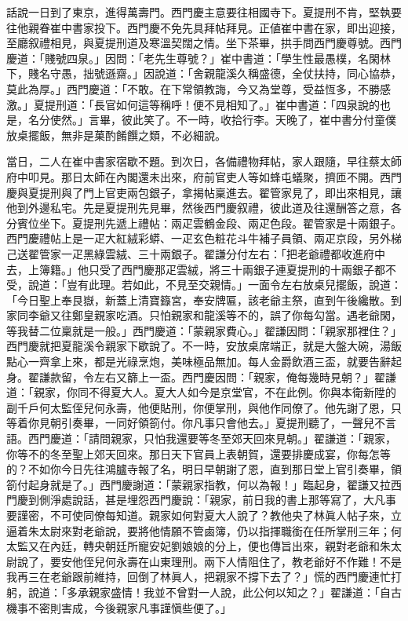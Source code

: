 話說一日到了東京，進得萬壽門。西門慶主意要往相國寺下。夏提刑不肯，堅執要往他親眷崔中書家投下。西門慶不免先具拜帖拜見。正値崔中書在家，即出迎接，至廳叙禮相見，與夏提刑道及寒溫契闊之情。坐下茶畢，拱手問西門慶尊號。西門慶道：「賤號四泉。」因問：「老先生尊號？」崔中書道：「學生性最愚樸，名閑林下，賤名守愚，拙號遜齋。」因說道：「舍親龍溪久稱盛德，全仗扶持，同心協恭，莫此為厚。」西門慶道：「不敢。在下常領教誨，今又為堂尊，受益恆多，不勝感激。」夏提刑道：「長官如何這等稱呼！便不見相知了。」崔中書道：「四泉說的也是，名分使然。」言畢，彼此笑了。不一時，收拾行李。天晚了，崔中書分付童僕放桌擺飯，無非是菓酌餚饌之類，不必細說。

當日，二人在崔中書家宿歇不題。到次日，各備禮物拜帖，家人跟隨，早往蔡太師府中叩見。那日太師在內閣還未出來，府前官吏人等如蜂屯蟻聚，擠匝不開。西門慶與夏提刑與了門上官吏兩包銀子，拿揭帖稟進去。翟管家見了，即出來相見，讓他到外邊私宅。先是夏提刑先見畢，然後西門慶叙禮，彼此道及往還酬答之意，各分賓位坐下。夏提刑先遞上禮帖：兩疋雲鶴金段、兩疋色段。翟管家是十兩銀子。西門慶禮帖上是一疋大紅絨彩蟒、一疋玄色粧花斗牛補子員領、兩疋京段，另外梯己送翟管家一疋黑綠雲絨、三十兩銀子。{}翟謙分付左右：「把老爺禮都收進府中去，上簿籍。」他只受了西門慶那疋雲絨，將三十兩銀子連夏提刑的十兩銀子都不受，說道：「豈有此理。若如此，不見至交親情。」一面令左右放桌兒擺飯，說道：「今日聖上奉艮嶽，新蓋上清寶籙宮，奉安牌匾，該老爺主祭，直到午後纔散。到家同李爺又往鄭皇親家吃酒。只怕親家和龍溪等不的，誤了你每勾當。遇老爺閑，等我替二位稟就是一般。」西門慶道：「蒙親家費心。」翟謙因問：「親家那裡住？」西門慶就把夏龍溪令親家下歇說了。不一時，安放桌席端正，就是大盤大碗，湯飯點心一齊拿上來，都是光祿烹炮，美味極品無加。每人金爵飲酒三盃，就要告辭起身。翟謙款留，令左右又篩上一盃。西門慶因問：「親家，俺每幾時見朝？」翟謙道：「親家，你同不得夏大人。夏大人如今是京堂官，不在此例。你與本衛新陞的副千戶何太監侄兒何永壽，他便貼刑，你便掌刑，與他作同僚了。他先謝了恩，只等着你見朝引奏畢，一同好領箚付。你凡事只會他去。」夏提刑聽了，一聲兒不言語。西門慶道：「請問親家，只怕我還要等冬至郊天回來見朝。」翟謙道：「親家，你等不的冬至聖上郊天回來。那日天下官員上表朝賀，還要排慶成宴，你每怎等的？不如你今日先往鴻臚寺報了名，明日早朝謝了恩，直到那日堂上官引奏畢，領箚付起身就是了。」西門慶謝道：「蒙親家指教，何以為報！」臨起身，翟謙又拉西門慶到側淨處說話，{}甚是埋怨西門慶說：「親家，前日我的書上那等寫了，大凡事要謹密，不可使同僚每知道。親家如何對夏大人說了？{}教他央了林眞人帖子來，立逼着朱太尉來對老爺說，{}要將他情願不管鹵簿，仍以指揮職銜在任所掌刑三年；何太監又在內廷，轉央朝廷所寵安妃劉娘娘的分上，便也傳旨出來，親對老爺和朱太尉說了，要安他侄兒何永壽在山東理刑。兩下人情阻住了，教老爺好不作難！不是我再三在老爺跟前維持，回倒了林眞人，把親家不撐下去了？」慌的西門慶連忙打躬，說道：「多承親家盛情！我並不曾對一人說，此公何以知之？」翟謙道：「自古機事不密則害成，今後親家凡事謹愼些便了。」

